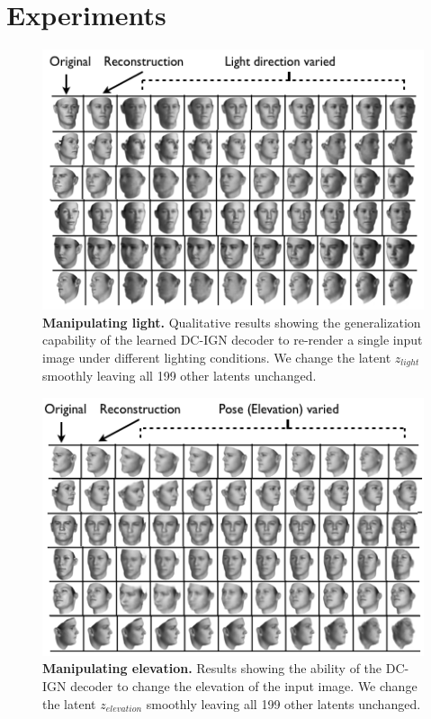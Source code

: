 \documentclass[12pt,twoside]{mitthesis}
\begin{document}
\section{Experiments}\label{experiments}

\begin{figure}[htbp]
\centering
\includegraphics{../figures/lightvaried.png}
\caption{\textbf{Manipulating light.} Qualitative results showing the
generalization capability of the learned DC-IGN decoder to re-render a
single input image under different lighting conditions. We change the
latent \(z_{light}\) smoothly leaving all 199 other latents unchanged.}
\end{figure}

\begin{figure}[htbp]
\centering
\includegraphics{../figures/elvaried.png}
\caption{\textbf{Manipulating elevation.} Results showing the ability of
the DC-IGN decoder to change the elevation of the input image. We change
the latent \(z_{elevation}\) smoothly leaving all 199 other latents
unchanged.}
\end{figure}
\end{document}
